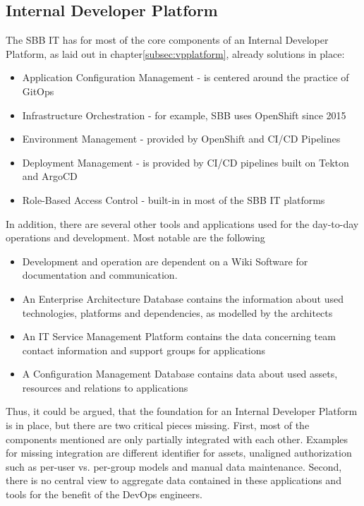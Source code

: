 \documentclass[a4paper,12pt]{article}
\begin{document}
    \subsection{Internal Developer Platform}
    \label{subsec:sbbplatform}
    The SBB IT has for most of the core components of an Internal Developer Platform, as laid out in chapter\ref{subsec:vpplatform},
    already solutions in place:
    \begin{itemize}
        \item Application Configuration Management - is centered around the practice of GitOps\parencite{hashicorpvault}
        \item Infrastructure Orchestration - for example, SBB uses OpenShift since 2015\parencite{rhsbbopenshift}
        \item Environment Management - provided by OpenShift and CI/CD Pipelines
        \item Deployment Management - is provided by CI/CD pipelines built on Tekton and ArgoCD\parencite{sbbtekton}
        \item Role-Based Access Control - built-in in most of the SBB IT platforms
    \end{itemize}
    In addition, there are several other tools and applications used for the day-to-day operations and development.
    Most notable are the following
    \begin{itemize}
        \item Development and operation are dependent on a Wiki Software for documentation and communication.
        \item An Enterprise Architecture Database contains the information about used technologies, platforms and
        dependencies, as modelled by the architects
        \item An IT Service Management Platform contains the data concerning team contact information and support groups for applications
        \item A Configuration Management Database contains data about used assets, resources and relations to applications
    \end{itemize}
    Thus, it could be argued, that the foundation for an Internal Developer Platform is in place, but there are two
    critical pieces missing.
    First, most of the components mentioned are only partially integrated with each other.
    Examples for missing integration are different identifier for assets, unaligned authorization such as per-user vs.
    per-group models and manual data maintenance.
    Second, there is no central view to aggregate data contained in these applications and tools for the benefit of
    the DevOps engineers.
\end{document}
